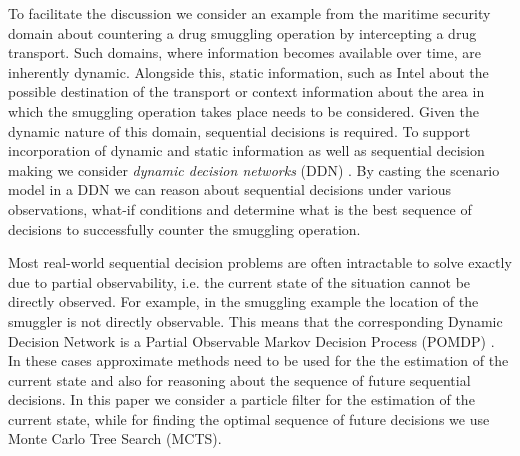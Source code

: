 \documentclass[conference]{IEEEtran}
\begin{document}
To facilitate the discussion we consider an example from the maritime security domain about countering a drug smuggling operation by intercepting a drug transport. Such domains, where information becomes available over time, are inherently dynamic. Alongside this, static information, such as Intel about the possible destination of the transport or context information about the area in which the smuggling operation takes place needs to be considered. Given the dynamic nature of this domain, sequential decisions is required. To support incorporation of dynamic and static information as well as sequential decision making we consider {\em dynamic decision networks} (DDN) \cite{russell02bn, jensen07book}. By casting the scenario model in a DDN we can reason about sequential decisions under various observations, what-if conditions and determine what is the best sequence of decisions to successfully counter the smuggling operation.

Most real-world sequential decision problems are often intractable to solve exactly due to partial observability, i.e. the current state of the situation cannot be directly observed. For example, in the smuggling example the location of the smuggler is not directly observable. This means that the corresponding Dynamic Decision Network is a Partial Observable Markov Decision Process (POMDP) \cite{russell02bn}. In these cases approximate methods need to be used for the the estimation of the current state and also for reasoning about the sequence of future sequential decisions. In this paper we consider a particle filter for the estimation of the current state, while for finding the optimal sequence of future decisions we use Monte Carlo Tree Search (MCTS).



\end{document}
